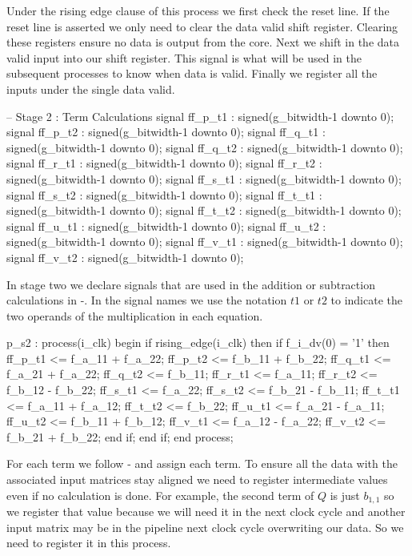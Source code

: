 Under the rising edge clause of this process we first check the reset line. If the reset line is asserted we only need to clear the data valid shift register. Clearing these registers ensure no data is output from the core. Next we shift in the data valid input into our shift register. This signal is what will be used in the subsequent processes to know when data is valid. Finally we register all the inputs under the single data valid. 

\begin{VHDLlisting}[tabsize=2]
-- Stage 2 : Term Calculations
signal ff_p_t1 : signed(g_bitwidth-1 downto 0);
signal ff_p_t2 : signed(g_bitwidth-1 downto 0);
signal ff_q_t1 : signed(g_bitwidth-1 downto 0);
signal ff_q_t2 : signed(g_bitwidth-1 downto 0);
signal ff_r_t1 : signed(g_bitwidth-1 downto 0);
signal ff_r_t2 : signed(g_bitwidth-1 downto 0);
signal ff_s_t1 : signed(g_bitwidth-1 downto 0);
signal ff_s_t2 : signed(g_bitwidth-1 downto 0);
signal ff_t_t1 : signed(g_bitwidth-1 downto 0);
signal ff_t_t2 : signed(g_bitwidth-1 downto 0);
signal ff_u_t1 : signed(g_bitwidth-1 downto 0);
signal ff_u_t2 : signed(g_bitwidth-1 downto 0);
signal ff_v_t1 : signed(g_bitwidth-1 downto 0);
signal ff_v_t2 : signed(g_bitwidth-1 downto 0);
\end{VHDLlisting} 

In stage two we declare signals that are used in the addition or subtraction calculations in -. In the signal names we use the notation $t1$ or $t2$ to indicate the two operands of the multiplication in each equation. 

\begin{VHDLlisting}[tabsize=2]
p_s2 : process(i_clk)
	begin
		if rising_edge(i_clk) then
			if f_i_dv(0) = '1' then
				ff_p_t1 <= f_a_11 + f_a_22;
				ff_p_t2 <= f_b_11 + f_b_22;
				ff_q_t1 <= f_a_21 + f_a_22;
				ff_q_t2 <= f_b_11;
				ff_r_t1 <= f_a_11;
				ff_r_t2 <= f_b_12 - f_b_22;
				ff_s_t1 <= f_a_22;
				ff_s_t2 <= f_b_21 - f_b_11;
				ff_t_t1 <= f_a_11 + f_a_12;
				ff_t_t2 <= f_b_22;
				ff_u_t1 <= f_a_21 - f_a_11;
				ff_u_t2 <= f_b_11 + f_b_12;
				ff_v_t1 <= f_a_12 - f_a_22;
				ff_v_t2	<= f_b_21 + f_b_22;
			end if;
		end if;
	end process;
\end{VHDLlisting}

For each term we follow - and assign each term. To ensure all the data with the associated input matrices stay aligned we need to register intermediate values even if no calculation is done. For example, the second term of $Q$ is just $b_{1,1}$ so we register that value because we will need it in the next clock cycle and another input matrix may be in the pipeline next clock cycle overwriting our data. So we need to register it in this process.

